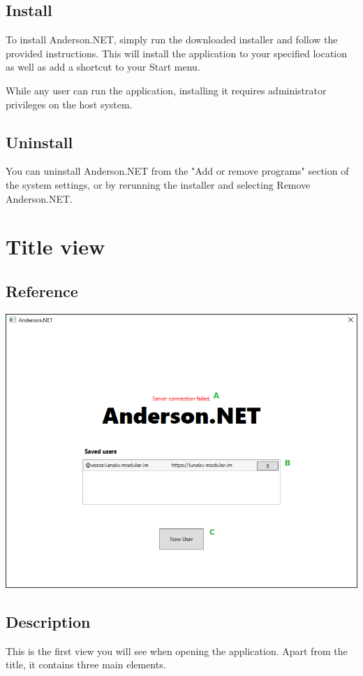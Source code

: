 \documentclass[titlepage]{scrartcl}
\begin{document}
\subsection{Install}
To install Anderson.NET, simply run the downloaded installer and follow the provided instructions. This will install the application to your specified location as well as add a shortcut to your Start menu.

While any user can run the application, installing it requires administrator privileges on the host system.

\subsection{Uninstall}
You can uninstall Anderson.NET from the "Add or remove programs" section of the system settings, or by rerunning the installer and selecting Remove Anderson.NET.

\section{Title view}
\subsection{Reference} 
\begin{center}
    \includegraphics[width=410pt]{title-window.png} 
\end{center}

\subsection{Description}
This is the first view you will see when opening the application. Apart from the title, it contains three main elements.
\end{document}

